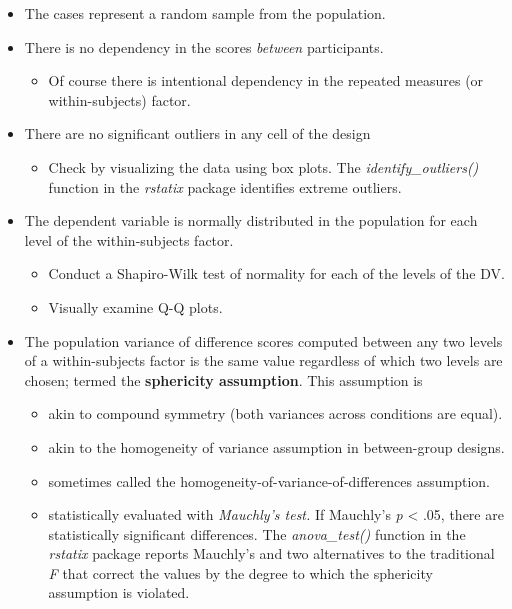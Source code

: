 \documentclass[
  11pt,
]{book}
\providecommand{\tightlist}{%
  \setlength{\itemsep}{0pt}\setlength{\parskip}{0pt}}
\begin{document}
\begin{itemize}
\tightlist
\item
  The cases represent a random sample from the population.
\item
  There is no dependency in the scores \emph{between} participants.

  \begin{itemize}
  \tightlist
  \item
    Of course there is intentional dependency in the repeated measures (or within-subjects) factor.
  \end{itemize}
\item
  There are no significant outliers in any cell of the design

  \begin{itemize}
  \tightlist
  \item
    Check by visualizing the data using box plots. The \emph{identify\_outliers()} function in the \emph{rstatix} package identifies extreme outliers.
  \end{itemize}
\item
  The dependent variable is normally distributed in the population for each level of the within-subjects factor.

  \begin{itemize}
  \tightlist
  \item
    Conduct a Shapiro-Wilk test of normality for each of the levels of the DV.
  \item
    Visually examine Q-Q plots.
  \end{itemize}
\item
  The population variance of difference scores computed between any two levels of a within-subjects factor is the same value regardless of which two levels are chosen; termed the \textbf{sphericity assumption}. This assumption is

  \begin{itemize}
  \tightlist
  \item
    akin to compound symmetry (both variances across conditions are equal).
  \item
    akin to the homogeneity of variance assumption in between-group designs.
  \item
    sometimes called the homogeneity-of-variance-of-differences assumption.
  \item
    statistically evaluated with \emph{Mauchly's test.} If Mauchly's \emph{p} \textless{} .05, there are statistically significant differences. The \emph{anova\_test()} function in the \emph{rstatix} package reports Mauchly's and two alternatives to the traditional \emph{F} that correct the values by the degree to which the sphericity assumption is violated.
  \end{itemize}
\end{itemize}
\end{document}

